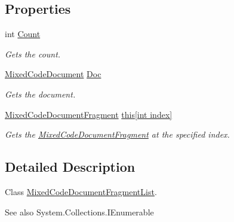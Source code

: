 \subsection*{Properties}
\begin{DoxyCompactItemize}
\item 
int \hyperlink{class_html_agility_pack_1_1_mixed_code_document_fragment_list_a6f126df60e9b829951be0fa4901a6f3d}{Count}
\begin{DoxyCompactList}\small\item\em Gets the count. \end{DoxyCompactList}\item 
\hyperlink{class_html_agility_pack_1_1_mixed_code_document}{Mixed\+Code\+Document} \hyperlink{class_html_agility_pack_1_1_mixed_code_document_fragment_list_a78a804d911d0d4af0b15e867b7fb4972}{Doc}
\begin{DoxyCompactList}\small\item\em Gets the document. \end{DoxyCompactList}\item 
\hyperlink{class_html_agility_pack_1_1_mixed_code_document_fragment}{Mixed\+Code\+Document\+Fragment} \hyperlink{class_html_agility_pack_1_1_mixed_code_document_fragment_list_a08a8326f2f72af58716cc533a685ad9c}{this\mbox{[}int index\mbox{]}}
\begin{DoxyCompactList}\small\item\em Gets the \hyperlink{class_html_agility_pack_1_1_mixed_code_document_fragment}{Mixed\+Code\+Document\+Fragment} at the specified index. \end{DoxyCompactList}\end{DoxyCompactItemize}


\subsection{Detailed Description}
Class \hyperlink{class_html_agility_pack_1_1_mixed_code_document_fragment_list}{Mixed\+Code\+Document\+Fragment\+List}. 

\begin{DoxySeeAlso}{See also}
System.\+Collections.\+I\+Enumerable


\end{DoxySeeAlso}


